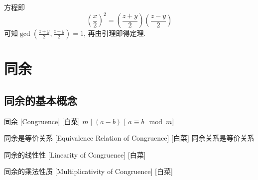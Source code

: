 \documentclass[UTF8]{ctexart}
\begin{document}
            \begin{prf}
                方程即
                \[(\frac{x}{2})^2=(\frac{z+y}{2})(\frac{z-y}{2})\]
                可知\(\gcd(\frac{z+y}{2},\frac{z-y}{2})=1\), 再由引理即得定理.
            \end{prf}
    \section{同余}
        \subsection{同余的基本概念}
            \begin{dfn}
                [Congruence]
                {同余}
                [Congruence]
                [白菜]
                    {\(m\mid (a-b)\)}
                    [ \(a\equiv b \mod m\)]
            \end{dfn}

            \begin{ppt}
                [CongruenceEquivalenceRelation]
                {同余是等价关系}
                [Equivalence Relation of Congruence]
                [白菜]
                \THM
                    {同余关系是等价关系}
            \end{ppt}

            \begin{ppt}
                [CongruenceLinearity]
                {同余的线性性}
                [Linearity of Congruence]
                [白菜]
            \end{ppt}

            \begin{ppt}
                [CongruenceMultiplicativity]
                {同余的乘法性质}
                [Multiplicativity of Congruence]
                [白菜]
            \end{ppt}
\end{document}
